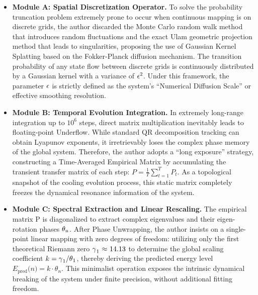 \documentclass[mca,article,submit,oneauthor,pdftex]{Definitions/mdpi}
\begin{document}
\begin{itemize}
\item
  \textbf{Module A: Spatial Discretization Operator.} To solve the
  probability truncation problem extremely prone to occur when
  continuous mapping is on discrete grids, the author discarded the Monte Carlo
  random walk method that introduces random fluctuations and the exact
  Ulam geometric projection method that leads to singularities,
  proposing the use of Gaussian Kernel Splatting based on the
  Fokker-Planck diffusion mechanism. The transition probability of any
  state flow between discrete grids is continuously distributed by a
  Gaussian kernel with a variance of \(\text{\ensuremath{\epsilon}}^{\text{2}}\). Under this
  framework, the parameter \(\text{\ensuremath{\epsilon}}\) is strictly defined as the
  system's ``Numerical Diffusion Scale'' or effective smoothing
  resolution.
\item
  \textbf{Module B: Temporal Evolution Integration.} In extremely
  long-range integration up to \(\text{10}^{\text{6}}\) steps, direct
  matrix multiplication inevitably leads to floating-point Underflow.
  While standard QR decomposition tracking can obtain Lyapunov
  exponents, it irretrievably loses the complex phase memory of the
  global system. Therefore, the author adopts a ``long exposure'' strategy,
  constructing a Time-Averaged Empirical Matrix by accumulating the
  transient transfer matrix of each step:
  \({P} = \frac{\text{1}}{{T}}\sum_{{t}{=1}}^{{T}}{P}_{{t}}\).
  As a topological snapshot of the cooling evolution process, this
  static matrix completely freezes the dynamical resonance information
  of the system.
\item
  \textbf{Module C: Spectral Extraction and Linear Rescaling.} The
  empirical matrix \(\text{P}\) is diagonalized to extract complex
  eigenvalues and their eigen-rotation phases \(\text{\ensuremath{\theta}}_{\text{n}}\).
  After Phase Unwrapping, the author insists on a single-point linear mapping
  with zero degrees of freedom: utilizing only the first theoretical
  Riemann zero \(\text{\ensuremath{\gamma}}_{\text{1}}~\text{\ensuremath{\approx}~14.13}\) to determine the
  global scaling coefficient
  \({k}=\text{\ensuremath{\gamma}}_{\text{1}}\text{/}\text{\ensuremath{\theta}}_{\text{1}}\),
  thereby deriving the predicted energy level
  \({E}_{\text{pred}} \text{(}{n})={k}{\ensuremath{\cdot}}{\ensuremath{\theta}}_{{n}}\).
  This minimalist operation exposes the intrinsic dynamical breaking of
  the system under finite precision, without additional fitting freedom.
\end{itemize}
\end{document}
